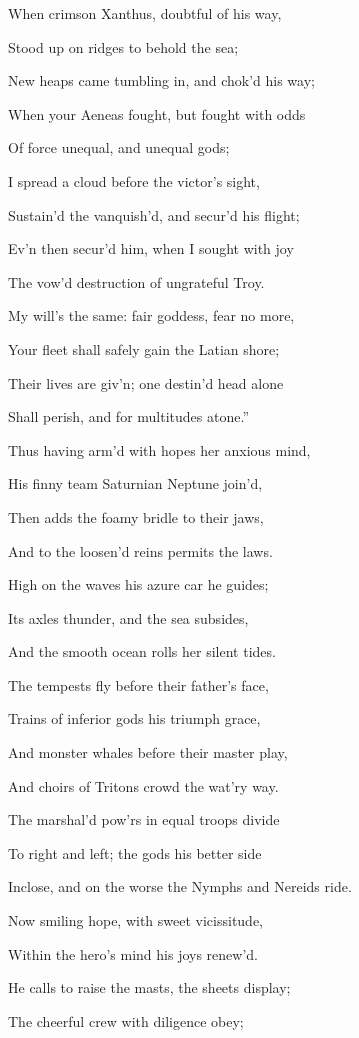 When crimson Xanthus, doubtful of his way,

Stood up on ridges to behold the sea;

New heaps came tumbling in, and chok’d his way;

When your Aeneas fought, but fought with odds

Of force unequal, and unequal gods;

I spread a cloud before the victor’s sight,

Sustain’d the vanquish’d, and secur’d his flight;

Ev’n then secur’d him, when I sought with joy

The vow’d destruction of ungrateful Troy.

My will’s the same: fair goddess, fear no more,

Your fleet shall safely gain the Latian shore;

Their lives are giv’n; one destin’d head alone

Shall perish, and for multitudes atone.”

Thus having arm’d with hopes her anxious mind,

His finny team Saturnian Neptune join’d,

Then adds the foamy bridle to their jaws,

And to the loosen’d reins permits the laws.

High on the waves his azure car he guides;

Its axles thunder, and the sea subsides,

And the smooth ocean rolls her silent tides.

The tempests fly before their father’s face,

Trains of inferior gods his triumph grace,

And monster whales before their master play,

And choirs of Tritons crowd the wat’ry way.

The marshal’d pow’rs in equal troops divide

To right and left; the gods his better side

Inclose, and on the worse the Nymphs and Nereids ride.

Now smiling hope, with sweet vicissitude,

Within the hero’s mind his joys renew’d.

He calls to raise the masts, the sheets display;

The cheerful crew with diligence obey;


